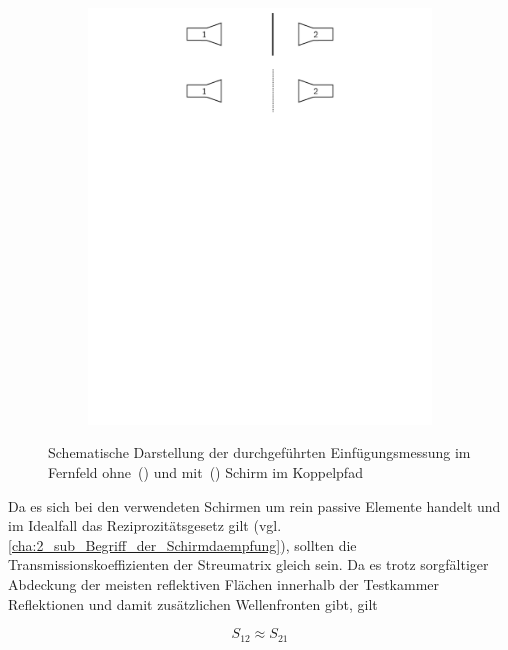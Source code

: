 \begin{figure}[ht]
\begin{subfigure}[b]{0.99\textwidth}
       \includegraphics[page = 1, width=\textwidth, trim = 0cm 17.5cm 0cm 0cm, clip]{Abbildungen/Kapitel4/Einfuegungsmessung.pdf}
        \caption{\label{subfig:4_Einfuegungsmessung_Fall2}}
    \end{subfigure}
    \caption[Schematische Darstellung der durchgeführten Einfügungsmessung]{Schematische Darstellung der durchgeführten Einfügungsmessung im Fernfeld ohne~() und mit~() Schirm im Koppelpfad}
    \label{fig:4_Einfuegungsmessung}
\end{figure}


Da es sich bei den verwendeten Schirmen um rein passive Elemente handelt und im Idealfall das Reziprozitätsgesetz gilt (vgl. \Abschnitt\ref{cha:2_sub_Begriff_der_Schirmdaempfung}), sollten die Transmissionskoeffizienten der Streumatrix gleich sein. Da es trotz sorgfältiger Abdeckung der meisten reflektiven Flächen innerhalb der Testkammer Reflektionen und damit zusätzlichen Wellenfronten gibt, gilt 

\begin{equation}
    S_{12} \approx S_{21}\label{eq:4_Naeherung_Transmissionskoeffizienten}
\end{equation}

